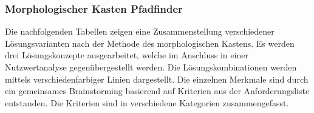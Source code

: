 \documentclass[main.tex]{subfiles} %
\begin{document}
\subsubsection{Morphologischer Kasten Pfadfinder}

Die nachfolgenden Tabellen zeigen eine Zusammenstellung verschiedener
Lösungsvarianten nach der Methode des morphologischen Kastens. Es werden drei
Lösungskonzepte ausgearbeitet, welche im Anschluss in einer Nutzwertanalyse
gegenübergestellt werden. Die Lösungskombinationen werden mittels
verschiedenfarbiger Linien dargestellt. Die einzelnen Merkmale sind durch ein
gemeinsames Brainstorming basierend auf Kriterien aus der Anforderungsliste
entstanden. Die Kriterien sind in verschiedene Kategorien zusammengefasst.

\begin{landscape} %
  \thispagestyle{fancy}


\end{landscape}
\end{document}
